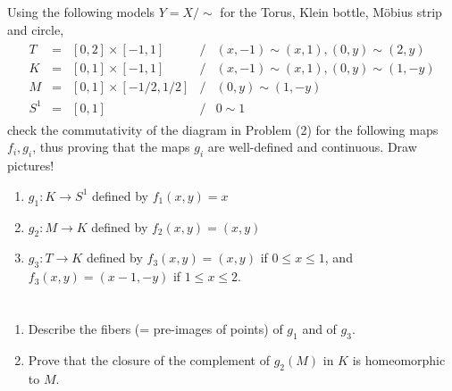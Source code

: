 \documentclass{jhwhw}
\begin{document}
\problem{}%
Using the following models $Y = X/\sim$ for the Torus, Klein bottle, M\"obius strip and circle,	
\begin{eqnarray*}
	\begin{array}{ccccl}
		T & = & [0,2]\times [-1,1] & / & (x,-1)\sim (x,1), (0,y)\sim (2,y)\\
		K & = & [0,1]\times [-1,1]  & / & (x,-1) \sim (x,1), (0,y)\sim (1,-y)\\
		M & = & [0,1]\times [-1/2,1/2] & / & (0,y)\sim (1,-y)\\
		S^1 & = & [0,1] & / & 0\sim 1
	\end{array}
\end{eqnarray*}
check the commutativity of the diagram in Problem (2) for the following  maps  $f_i, g_i$, thus proving  that the maps $g_i$ are well-defined and continuous. Draw pictures!
\begin{enumerate}
	
	\item $g_1: K \to S^1$ defined by $ f_1(x,y) = x$
	\item $g_2: M \to K$ defined by $f_2 (x,y) = (x,y)$ 
	\item $g_3:T\to K$ defined by $f_3(x,y) = (x,y)$ if $0\le x\le 1$, and $f_3(x,y) = (x-1,-y)$ if $1\le x\le 2$.
\end{enumerate}
\solution{}
\part{}%


\part{}%


\part{}%

\problem{}%
\begin{enumerate}
	\item Describe the fibers (= pre-images of points) of $g_1$ and of $g_3$.
	\item Prove that the closure of the complement of $g_2(M)$ in $K$  is homeomorphic to $M$.
	
\end{enumerate}
\solution{}
\part{}%

\part{}%
\end{document}
